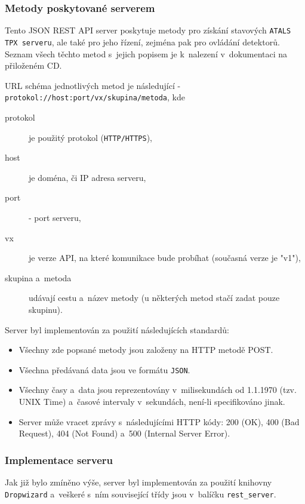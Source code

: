 \subsubsection{Metody poskytované serverem}
Tento JSON REST API server poskytuje metody pro získání stavových \texttt{ATALS TPX serveru}, ale také pro jeho řízení, zejména pak pro ovládání detektorů. Seznam všech těchto metod s~jejich popisem je k~nalezení v~dokumentaci na přiloženém CD.

URL schéma jednotlivých metod je následující - \texttt{protokol://host:port/vx/skupina/metoda}, kde
\begin{description}
	\item[protokol] je použitý protokol (\texttt{HTTP/HTTPS}),
	\item[host] je doména, či IP adresa serveru,
	\item[port] - port serveru,
	\item[vx] je verze API, na které komunikace bude probíhat (současná verze je "v1"),
	\item[skupina a~metoda] udávají cestu a~název metody (u některých metod stačí zadat pouze skupinu).
\end{description}

Server byl implementován za použití následujících standardů:
\begin{itemize}
	\item Všechny zde popsané metody jsou založeny na HTTP metodě POST.
	\item Všechna předávaná data jsou ve formátu \texttt{JSON}. 
	\item Všechny časy a~data jsou reprezentovány v~milisekundách od 1.1.1970 (tzv. UNIX Time) a~časové intervaly v~sekundách, není-li specifikováno jinak.
	\item Server může vracet zprávy s~následujícími HTTP kódy: 200 (OK), 400 (Bad Request), 404 (Not Found) a~500 (Internal Server Error).
\end{itemize}


\subsubsection{Implementace serveru}\label{atlas:cont:api:init}
Jak již bylo zmíněno výše, server byl implementován za použití knihovny \texttt{Dropwizard} a~veškeré s~ním související třídy jsou v~balíčku \texttt{rest\_server}.

